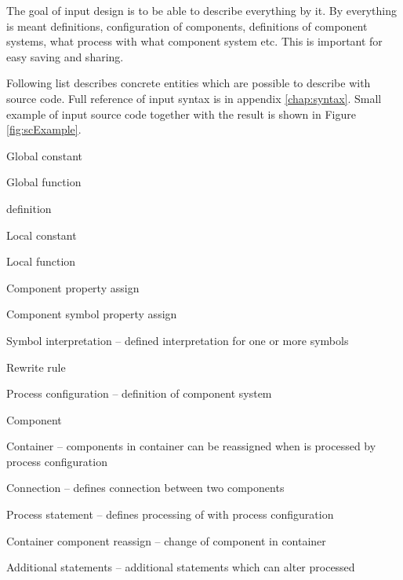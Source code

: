 The goal of input design is to be able to describe everything by it.
By everything is meant \lsystem definitions, configuration of components, definitions of component systems, what \lsystem process with what component system etc.
This is important for easy saving and sharing.

Following list describes concrete entities which are possible to describe with source code.
Full reference of input syntax is in appendix \ref{chap:syntax}.
Small example of input source code together with the result is shown in Figure \ref{fig:scExample}.

\begin{itemize*}
	\item Global constant
	\item Global function
	\item \lsystem definition
		\begin{itemize*}
			\item Local constant
			\item Local function
			\item Component property assign
			\item Component symbol property assign
			\item Symbol interpretation -- defined interpretation for one or more \lsystem symbols
			\item Rewrite rule
		\end{itemize*}
	\item Process configuration -- definition of component system
		\begin{itemize*}
			\item Component
			\item Container -- components in container can be reassigned when \lsystem is processed by process configuration
			\item Connection -- defines connection between two components
		\end{itemize*}
	\item Process statement -- defines processing of \lsystem with process configuration
		\begin{itemize*}
			\item Container component reassign -- change of component in container
			\item Additional \lsystem statements -- additional \lsystem statements which can alter processed \lsystem
		\end{itemize*}
\end{itemize*}

